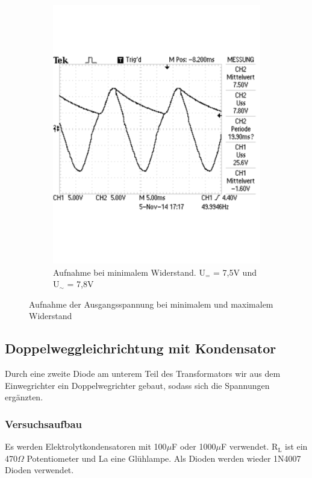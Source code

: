 \documentclass[12pt,a4paper]{article}
\begin{document}
\begin{figure}[H]
\begin{subfigure}[b]{0.48\textwidth}
                \includegraphics[width=\textwidth , scale = 0.4]{2_4_100F_2.pdf}
                \caption[Aufnahme bei minimalem Widerstand. U$_{=}$ = 7,5V und U$_\sim$ = 7,8V]{Aufnahme bei minimalem Widerstand. U$_{=}$ = 7,5V und U$_\sim$ = 7,8V}
  				\label{fig:2_4_1000F_2}
        \end{subfigure}
        \caption{Aufnahme der Ausgangsspannung bei minimalem und maximalem Widerstand}
        \label{fig:2_4_1000F}
\end{figure}

\subsection{Doppelweggleichrichtung mit Kondensator}

Durch eine zweite Diode am unterem Teil des Transformators wir aus dem Einwegrichter ein Doppelwegrichter gebaut, sodass sich die Spannungen ergänzten.

\subsubsection{Versuchsaufbau}
Es werden Elektrolytkondensatoren mit 100$\mu$F oder 1000$\mu$F verwendet. R$_\text{L}$ ist ein 470$\Omega$ Potentiometer und La eine Glühlampe. Als Dioden werden wieder 1N4007 Dioden verwendet.
\end{document}
